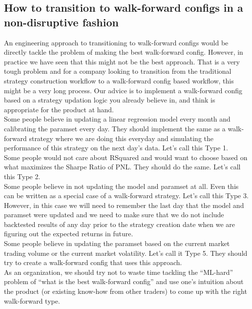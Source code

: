 \documentclass[a4paper]{article}
\begin{document}
\subsection{How to transition to walk-forward configs in a non-disruptive fashion}
An engineering approach to transitioning to walk-forward configs would be directly tackle the problem of making the best walk-forward config. However, in practice we have seen that this might not be the best approach. That is a very tough problem and for a company looking to transition from the traditional strategy construction workflow to a walk-forward config based workflow, this might be a very long process. Our advice is to implement a walk-forward config based on a strategy updation logic you already believe in, and think is appropriate for the product at hand.\\
Some people believe in updating a linear regression model every month and calibrating the paramset every day. They should implement the same as a walk-forward strategy where we are doing this everyday and simulating the performance of this strategy on the next day's data. Let's call this Type 1.\\
Some people would not care about RSquared and would want to choose based on what maximizes the Sharpe Ratio of PNL. They should do the same. Let's call this Type 2.\\
Some people believe in not updating the model and paramset at all. Even this can be written as a special case of a walk-forward strategy. Let's call this Type 3. However, in this case we will need to remember the last day that the model and paramset were updated and we need to make sure that we do not include backtested results of any day prior to the strategy creation date when we are figuring out the expected returns in future.\\
Some people believe in updating the paramset based on the current market trading volume or the current market volatility. Let's call it Type 5. They should try to create a walk-forward config that uses this approach.\\
As an organization, we should try not to waste time tackling the ``ML-hard'' problem of ``what is the best walk-forward config'' and use one's intuition about the product (or existing know-how from other traders) to come up with the right walk-forward type.
\end{document}
